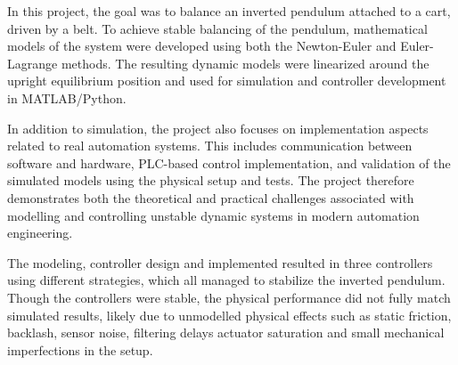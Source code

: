 In this project, the goal was to balance an inverted pendulum attached to a cart, driven by a belt. To achieve stable balancing of the pendulum, mathematical models of the system were developed using both the Newton-Euler and Euler-Lagrange methods. The resulting dynamic models were linearized around the upright equilibrium position and used for simulation and controller development in MATLAB/Python. 

In addition to simulation, the project also focuses on implementation aspects related to real automation systems. This includes communication between software and hardware, PLC-based control implementation, and validation of the simulated models using the physical setup and tests. The project therefore demonstrates both the theoretical and practical challenges associated with modelling and controlling unstable dynamic systems in modern automation engineering. 

The modeling, controller design and implemented resulted in three controllers using different strategies, which all managed to stabilize the inverted pendulum. Though the controllers were stable, the physical performance did not fully match simulated results, likely due to unmodelled physical effects such as static friction, backlash, sensor noise, filtering delays actuator saturation and small mechanical imperfections in the setup.